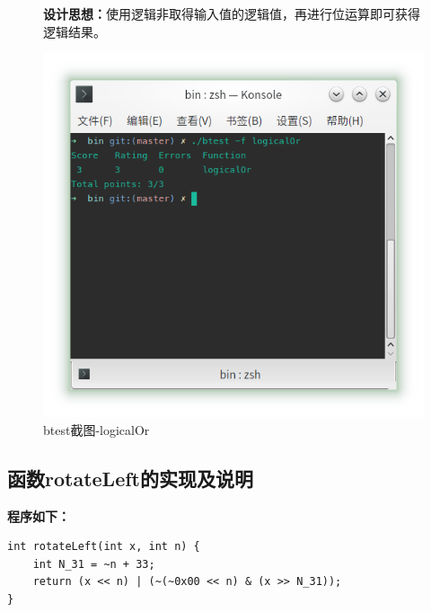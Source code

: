 \begin{figure}[H]
\begin{minipage}[c]{0.5\linewidth}
\textbf{设计思想：}使用逻辑非取得输入值的逻辑值，再进行位运算即可获得逻辑结果。
        
\end{minipage}
\begin{minipage}[c]{0.4\linewidth}
\centering
\includegraphics[width=0.9\linewidth]{figures/logicalOr}
\caption{btest截图-logicalOr}
\label{fig:logicalOr}
\end{minipage}
\end{figure}

\subsection{函数rotateLeft的实现及说明}
\textbf{程序如下：}
    
\begin{verbatim}
int rotateLeft(int x, int n) {
    int N_31 = ~n + 33;
    return (x << n) | (~(~0x00 << n) & (x >> N_31));
}
\end{verbatim}
    
